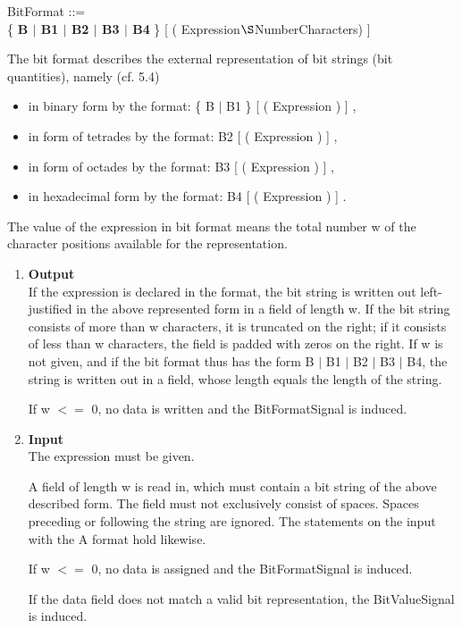 BitFormat ::=\\
\x \{ {\bf B $\mid$ B1 $\mid$ B2 $\mid$ B3 $\mid$ B4} \} [ ( Expression$\S $NumberCharacters) ]

The bit format describes the external representation of bit strings (bit
quantities), namely (cf. 5.4)
\begin{itemize}
\item in binary form by the format: \{ B $\mid$ B1 \} [ ( Expression ) ] ,
\item in form of tetrades by the format: B2 [ ( Expression ) ] ,
\item in form of octades by the format: B3 [ ( Expression ) ] ,
\item in hexadecimal form by the format: B4 [ ( Expression ) ] .
\end{itemize}

The value of the expression in bit format means the total number w of
the character positions available for the representation.
\begin{enumerate}
\item {\bf Output}\\
If the expression is declared in the format, the bit string is written
out left-justified in the above represented form in a field of length
w. If the bit string consists of more than w characters, it is truncated
on the right; if it consists of less than w characters, the field is
padded with zeros on the right. If w is not given, and if the bit format
thus has the form B $\mid$ B1 $\mid$ B2 $\mid$ B3 $\mid$ B4, the string
is written out in a field, whose length equals the length of the
string.

\begin{added}
If w $<=$ 0, no data is written and the BitFormatSignal is induced.
\end{added}

\item {\bf Input}\\
The expression must be given.

A field of length w is read in, which must contain a bit string of the
above described form. The field must not exclusively consist of spaces.
Spaces preceding or following the string are ignored. The statements on
the input with the A format hold likewise.

\begin{added}
If w $<=$ 0, no data is assigned and the BitFormatSignal is induced.

If the data field does not match a valid bit representation, the
BitValueSignal is induced.
\end{added}
\end{enumerate}

